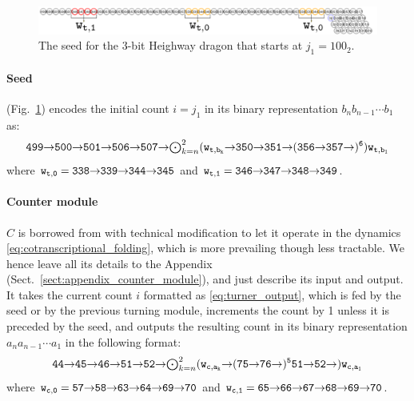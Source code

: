 \documentclass[runningheads]{llncs}
\newcommand{\east}{{\ensuremath \to}}
\newcommand{\se}{{\ensuremath \searrow}}
\begin{document}
\begin{figure}[tb]
\includegraphics[width=\linewidth]{Figs/seed_sample2.png}
\caption{The seed for the 3-bit Heighway dragon that starts at $j_1 = 100_2$.}
\label{fig:seed}
\end{figure}

\paragraph{Seed} (Fig.~\ref{fig:seed}) encodes the initial count $i = j_1$ in its binary representation $b_n b_{n-1} \cdots b_1$ as: 
\begin{equation}\label{eq:turner_output}
	{\tt 499 \east 500 \east 501 \east 506 \east 507 \east \mbox{$\bigodot_{k = n}^2$} (w_{t, b_k} \east 350 \east 351 \east (356 \east 357 \east)^6) w_{t, b_1}} 
\end{equation}
where ${\tt w_{t, 0} = 338 \east 339 \east 344 \east 345}$ and ${\tt w_{t, 1} = 346 \east 347 \east 348 \east 349}$. 


\paragraph{Counter module} $C$ is borrowed from \cite{GeMeScSe2016} with technical modification to let it operate in the dynamics \eqref{eq:cotranscriptional_folding}, which is more prevailing \cite{HanKim2017,HaKiOtSe2016,OtaSeki2017} though less tractable. 
We hence leave all its details to the Appendix (Sect.~\ref{sect:appendix_counter_module}), and just describe its input and output. 
It takes the current count $i$ formatted as \eqref{eq:turner_output}, which is fed by the seed or by the previous turning module, increments the count by 1 unless it is preceded by the seed, and outputs the resulting count in its binary representation $a_n a_{n-1} \cdots a_1$ in the following format:
\begin{equation}\label{eq:counter_output}{\tt 
	44 \east 45 \east 46 \east 51 \east 52 \east \mbox{$\bigodot_{k = n}^2$} (w_{c, a_k} \east (75 \east 76 \east)^5 51 \east 52 \east) w_{c, a_1}
}\end{equation}
where ${\tt w_{c, 0} = 57 \east 58 \east 63 \east 64 \east 69 \east 70}$ and ${\tt w_{c, 1} = 65 \east 66 \east 67 \east 68 \east 69 \east 70}$. 
\end{document}
